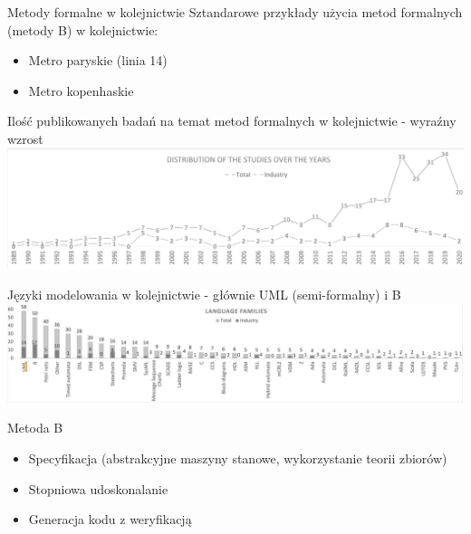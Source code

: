\documentclass{purdue-poster}
\begin{document}
\begin{frame}{}
\begin{columns}[T]
\begin{column}{.48\linewidth}
\begin{block}{Metody formalne w kolejnictwie}
        Sztandarowe przykłady użycia metod formalnych (metody B) w kolejnictwie:
        \begin{itemize}
            \item Metro paryskie (linia 14)
            \item Metro kopenhaskie
        \end{itemize}

    \end{block}

    \begin{block}{Ilość publikowanych badań na temat metod formalnych w kolejnictwie - wyraźny wzrost}
        \centering
        \includegraphics[width=0.9\linewidth,keepaspectratio]{train-studies-popularity.png}
    \end{block}

    \begin{block}{Języki modelowania w kolejnictwie - głównie UML (semi-formalny) i B}
        \centering
        \includegraphics[width=0.9\linewidth,keepaspectratio]{trains-languages.png}
    \end{block}

    \begin{block}{Metoda B}
        \begin{itemize}
            \item Specyfikacja (abstrakcyjne maszyny stanowe, wykorzystanie teorii zbiorów)
            \item Stopniowa udoskonalanie
            \item Generacja kodu z weryfikacją
        \end{itemize}
    \end{block}

    

\end{column}
\end{columns}
\end{frame}
\end{document}
